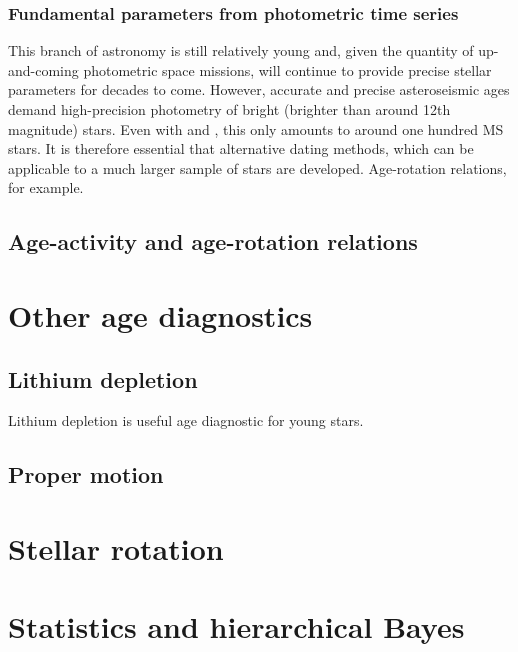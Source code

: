 \subsubsection{Fundamental parameters from photometric time series}

This branch of astronomy is still relatively young and, given the quantity of
up-and-coming photometric space missions, will continue to provide precise
stellar parameters for decades to come.
However, accurate and precise asteroseismic ages demand high-precision
photometry of bright (brighter than around 12th magnitude) stars.
Even with \kepler and \corot, this only amounts to around one hundred MS
stars.
It is therefore essential that alternative dating methods, which can be
applicable to a much larger sample of stars are developed.
Age-rotation relations, for example.

\subsection{Age-activity and age-rotation relations}



\section{Other age diagnostics}

\subsection{Lithium depletion}
Lithium depletion is useful age diagnostic for young stars.

\subsection{Proper motion}

\section{Stellar rotation}

\section{Statistics and hierarchical Bayes}
